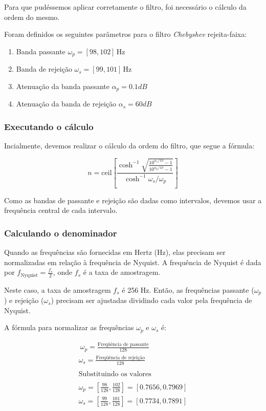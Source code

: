 Para que pudéssemos aplicar corretamente o filtro, foi necessário o cálculo da ordem do mesmo.

Foram definidos os seguintes parâmetros para o filtro \textit{Chebyshev} rejeita-faixa:

\begin{enumerate}
    \item Banda passante $\omega_p= [98, 102] \, \text{Hz}$
    \item Banda de rejeição $\omega_s = [99, 101]\, \text{Hz}$
    \item Atenuação da banda passante $\alpha_p = 0.1dB$
    \item Atenuação da banda de rejeição $\alpha_s = 60dB$
\end{enumerate}


\subsubsection*{Executando o cálculo}
Incialmente, devemos realizar o cálculo da ordem do filtro, que segue a fórmula:

$$
    n = \text{ceil} \left[ \frac{\cosh^{-1}{\sqrt{\frac{10^{\alpha_s/10}- 1}{10^{\alpha_p/10}-1}}}}{\cosh^{-1}{\omega_s/\omega_p}} \right]
$$


Como as bandas de passante e rejeição são dadas como intervalos, devemos usar a frequência central de cada intervalo.

\subsubsection*{Calculando o denominador}

Quando as frequências são fornecidas em Hertz (Hz), elas precisam ser normalizadas em relação à frequência de Nyquist. A frequência de Nyquist é dada por $f_{\text{Nyquist}} = \frac{f_s}{2}$, onde $f_s$ é a taxa de amostragem.

Neste caso, a taxa de amostragem $f_s$ é 256 Hz. Então, as frequências passante ($\omega_p$) e rejeição ($\omega_s$) precisam ser ajustadas dividindo cada valor pela frequência de Nyquist.

A fórmula para normalizar as frequências $\omega_p$ e $\omega_s$ é:

\begin{align*} \
    \omega_p = \frac{\text{Freqüência de passante}}{128}                       \\
    \omega_s = \frac{\text{Freqüência de rejeição}}{128}                       \\
    \\
    \text{Substituindo os valores}                                             \\
    \\
    \omega_p = \left[\frac{98}{128}, \frac{102}{128}\right] = [0.7656, 0.7969] \\
    \omega_s = \left[\frac{99}{128}, \frac{101}{128}\right] = [0.7734, 0.7891]
\end{align*}

